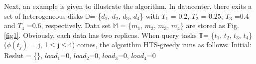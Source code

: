 \documentclass[conference]{IEEEtran}
\begin{document}

Next, an example is given to illustrate the algorithm. In datacenter, there exits a set of heterogeneous disks $\mathbb{D}$= \{$d_1$, $d_2$, $d_3$, $d_4$\} with $T_1$ = 0.2,  $T_2$ = 0.25,  $T_3$ =0.4 and $T_4$ =0.6, respectively. Data set $\mathbb{M}$ = \{$m_1$, $m_2$, $m_3$, $m_4$\} are stored as Fig.\ref{fig1}. Obviously, each data has two replicas. When query tasks $\mathbb{T}$= \{$t_1$, $t_2$, $t_3$, $t_4$\} ($\phi(t_j)$ = j, 1$\leq$j$ \leq$4) comes, the algorithm HTS-greedy runs as follows: %
Initial: Reslut = \{\}, $load_1$=0, $load_2$=0, $load_3$=0, $load_4$=0
\end{document}

